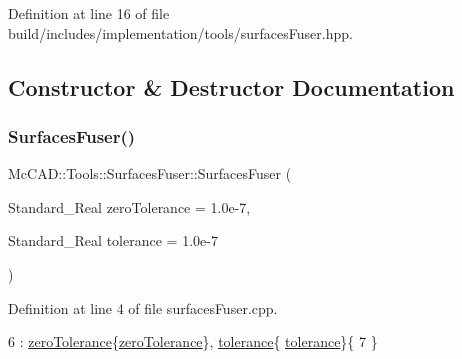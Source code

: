 Definition at line 16 of file build/includes/implementation/tools/surfaces\+Fuser.\+hpp.



\subsection{Constructor \& Destructor Documentation}
\mbox{\label{classMcCAD_1_1Tools_1_1SurfacesFuser_a7e369e5001c4e14ccb690d61faa0018c}} 
\subsubsection{\texorpdfstring{Surfaces\+Fuser()}{SurfacesFuser()}\hspace{0.1cm}{\footnotesize\ttfamily [1/2]}}
{\footnotesize\ttfamily Mc\+C\+A\+D\+::\+Tools\+::\+Surfaces\+Fuser\+::\+Surfaces\+Fuser (\begin{DoxyParamCaption}\item[{Standard\+\_\+\+Real}]{zero\+Tolerance = {\ttfamily 1.0e-\/7},  }\item[{Standard\+\_\+\+Real}]{tolerance = {\ttfamily 1.0e-\/7} }\end{DoxyParamCaption})}



Definition at line 4 of file surfaces\+Fuser.\+cpp.


\begin{DoxyCode}
6     : \hyperlink{classMcCAD_1_1Tools_1_1SurfacesFuser_a7ff8c39d261160d8c0e81be599ce9835}{zeroTolerance}\{\hyperlink{classMcCAD_1_1Tools_1_1SurfacesFuser_a7ff8c39d261160d8c0e81be599ce9835}{zeroTolerance}\}, \hyperlink{classMcCAD_1_1Tools_1_1SurfacesFuser_ad93b6c71e01c6b0692203d1671b7e8a4}{tolerance}\{
      \hyperlink{classMcCAD_1_1Tools_1_1SurfacesFuser_ad93b6c71e01c6b0692203d1671b7e8a4}{tolerance}\}\{
7 \}
\end{DoxyCode}
\mbox{\label{classMcCAD_1_1Tools_1_1SurfacesFuser_a7e369e5001c4e14ccb690d61faa0018c}} 
